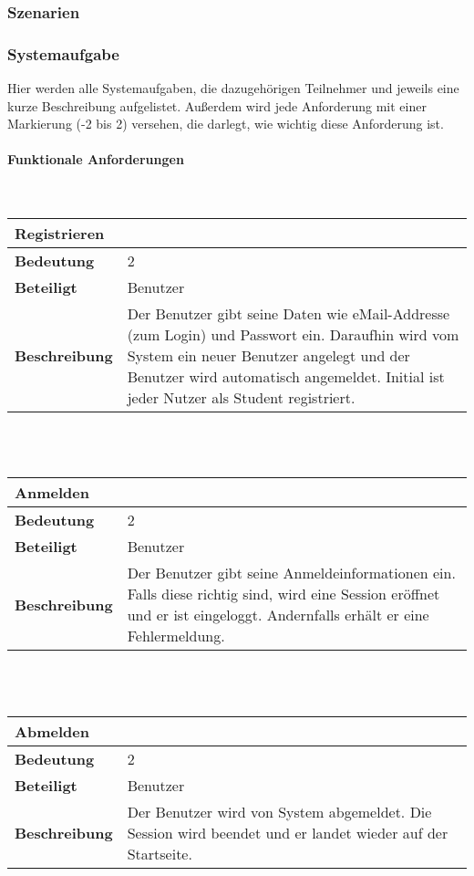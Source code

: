 \documentclass[12pt,a4paper]{article}
\begin{document}
\subsubsection{Szenarien}
\subsubsection{Systemaufgabe}
Hier werden alle Systemaufgaben, die dazugehörigen Teilnehmer und jeweils eine kurze Beschreibung aufgelistet. Außerdem wird jede Anforderung mit einer Markierung (-2 bis 2) versehen, die darlegt, wie wichtig diese Anforderung ist.
\paragraph{Funktionale Anforderungen}\mbox{}\\

\begin{tabular}{l p{10cm}}
\multicolumn{2}{l}{\textbf{Registrieren}} \\ \hline
\textbf{Bedeutung} & 2 \\ \hline 
\textbf{Beteiligt} & Benutzer \\ \hline 
\textbf{Beschreibung} & Der Benutzer gibt seine Daten wie eMail-Addresse (zum Login) und Passwort ein. Daraufhin wird vom System ein neuer Benutzer angelegt und der Benutzer wird automatisch angemeldet. Initial ist jeder Nutzer als Student registriert.\\ 
\hline 
\end{tabular}\\\\

\begin{tabular}{l p{10cm}}
\multicolumn{2}{l}{\textbf{Anmelden}} \\ \hline
\textbf{Bedeutung} & 2 \\ \hline 
\textbf{Beteiligt} & Benutzer \\ \hline 
\textbf{Beschreibung} & Der Benutzer gibt seine Anmeldeinformationen ein. Falls diese richtig sind, wird eine Session eröffnet und er ist eingeloggt. Andernfalls erhält er eine Fehlermeldung. \\ 
\hline 
\end{tabular}\\\\

\begin{tabular}{l p{10cm}}
\multicolumn{2}{l}{\textbf{Abmelden}} \\ \hline
\textbf{Bedeutung} & 2 \\ \hline 
\textbf{Beteiligt} & Benutzer \\ \hline 
\textbf{Beschreibung} & Der Benutzer wird von System abgemeldet. Die Session wird beendet und er landet wieder auf der Startseite. \\ 
\hline 
\end{tabular}\\\\
\end{document}
